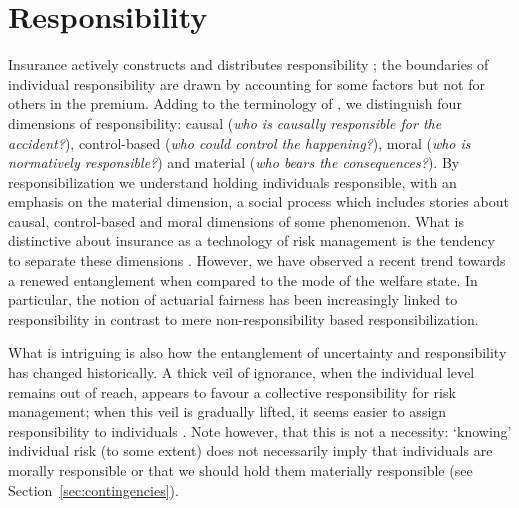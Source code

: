 \documentclass[11pt]{article} %
\begin{document}
\section{Responsibility}
Insurance actively constructs and distributes responsibility \citep{baker2002risk}; the boundaries of individual responsibility are drawn by accounting for some factors but not for others in the premium. 
Adding to the terminology of \citet{landes2015insurance}, we distinguish four dimensions of responsibility: causal (\textit{who is causally responsible for the accident?}), control-based (\textit{who could control the happening?}), moral (\textit{who is normatively responsible?}) and material (\textit{who bears the consequences?}). By responsibilization we understand holding individuals responsible, with an emphasis on the material dimension, a social process which includes stories about causal, control-based and moral dimensions of some phenomenon. What is distinctive about insurance as a technology of risk management is the tendency to separate these dimensions \citep{landes2015insurance}. However, we have observed a recent trend towards a renewed entanglement when compared to the mode of the welfare state. In particular, the notion of actuarial fairness has been increasingly linked to responsibility in contrast to mere non-responsibility based responsibilization.


What is intriguing is also how the entanglement of uncertainty and responsibility has changed historically. A thick veil of ignorance, when the individual level remains out of reach, appears to favour a collective responsibility for risk management; when this veil is gradually lifted, it seems easier to assign responsibility to individuals \citep{frezal2020fairness,barry2020insurance}. Note however, that this is not a necessity: `knowing' individual risk (to some extent) does not necessarily imply that individuals are morally responsible or that we should hold them materially responsible (see Section~\ref{sec:contingencies}).
\end{document}
